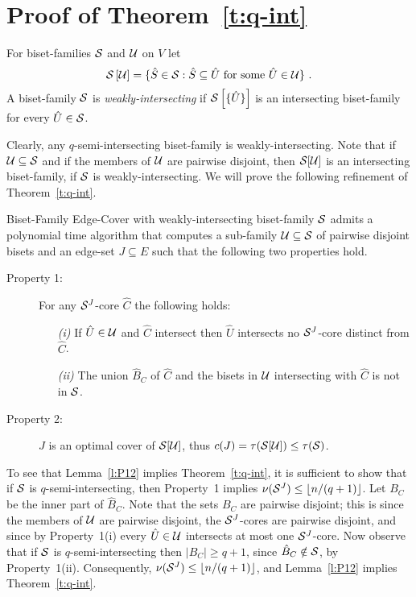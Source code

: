 \section{Proof of Theorem~\ref{t:q-int}} \label{s:q-int}

\begin{definition}
For biset-families ${\cal S}$ and ${\cal U}$ on $V$ let 
$${\cal S}\left[{\cal U}\right]=
\{\hat{S} \in {\cal S}: \hat{S} \subseteq \hat{U} \mbox{ for some } \hat{U} \in {\cal U}\} \ .$$
A biset-family ${\cal S}$ is {\em weakly-intersecting} if ${\cal S}\left[\{\hat{U}\}\right]$ is 
an intersecting biset-family for every $\hat{U} \in {\cal S}$.
\end{definition}

Clearly, any $q$-semi-intersecting biset-family is weakly-intersecting.
Note that if ${\cal U} \subseteq {\cal S}$ 
and if the members of ${\cal U}$ are pairwise disjoint, 
then ${\cal S}[{\cal U}]$ is an intersecting biset-family, if ${\cal S}$ is weakly-intersecting.
We will prove the following refinement of Theorem~\ref{t:q-int}.

\begin{lemma} \label{l:P12}
{\sf Biset-Family Edge-Cover} with weakly-intersecting biset-family ${\cal S}$ admits a polynomial time algorithm 
that computes a sub-family ${\cal U} \subseteq {\cal S}$ of pairwise disjoint bisets  
and an edge-set $J \subseteq E$ such that the following two properties hold.
\begin{description}
\item[Property 1:] 
For any ${\cal S}^J$-core $\hat{C}$ the following holds:
\begin{itemize}
\item[{\em (i)}]
If $\hat{U} \in {\cal U}$ and $\hat{C}$ intersect then $\hat{U}$ intersects 
no ${\cal S}^J$-core distinct from $\hat{C}$. 
\item[{\em (ii)}]
The union $\hat{B}_C$ of $\hat{C}$ and the bisets in ${\cal U}$ intersecting with $\hat{C}$
is not in ${\cal S}$.
\end{itemize}
\item[Property 2:] 
$J$ is an optimal cover of ${\cal S}[{\cal U}]$, thus
$c(J)=\tau({\cal S}[{\cal U}]) \leq \tau({\cal S})$. 
\end{description}
\end{lemma}

To see that Lemma~\ref{l:P12} implies Theorem~\ref{t:q-int},
it is sufficient to show that if ${\cal S}$ is $q$-semi-intersecting, then 
Property~1 implies $\nu({\cal S}^J) \leq \left\lfloor n/(q+1) \right\rfloor$.
Let $B_C$ be the inner part of $\hat{B}_C$.
Note that the sets $B_C$ are pairwise disjoint;
this is since the members of ${\cal U}$ are pairwise disjoint, the ${\cal S}^J$-cores are pairwise disjoint, 
and since by Property~1(i) every $\hat{U} \in {\cal U}$ intersects at most one ${\cal S}^J$-core.
Now observe that if ${\cal S}$ is $q$-semi-intersecting then $|B_C| \geq q+1$, 
since $\hat{B}_C \notin {\cal S}$, by Property~1(ii).
Consequently, $\nu({\cal S}^J) \leq \left\lfloor n/(q+1) \right\rfloor$,
and Lemma~\ref{l:P12} implies Theorem~\ref{t:q-int}.

